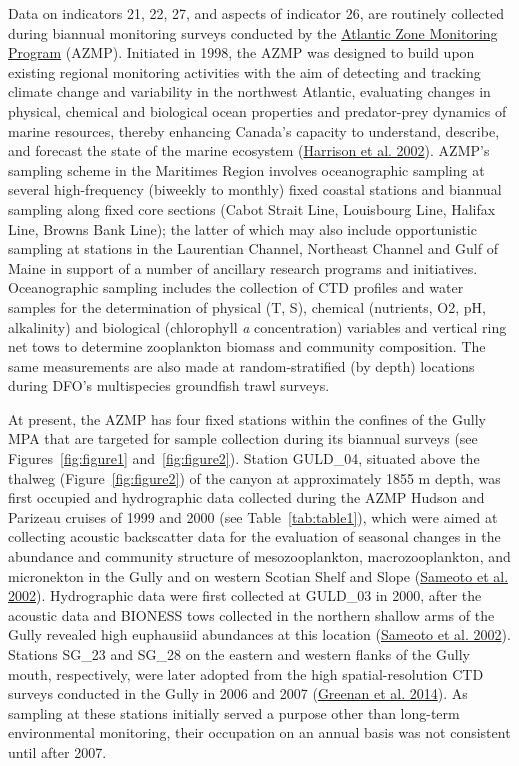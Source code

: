 \documentclass[12pt]{article}\usepackage[]{graphicx}\usepackage[]{color}
\begin{document}
Data on indicators 21, 22, 27, and aspects of indicator 26, are routinely collected during biannual monitoring surveys conducted by the \href{https://www.dfo-mpo.gc.ca/science/data-donnees/azmp-pmza/index-eng.html}{Atlantic Zone Monitoring Program} (AZMP). Initiated in 1998, the AZMP was designed to build upon existing regional monitoring activities with the aim of detecting and tracking climate change and variability in the northwest Atlantic, evaluating changes in physical, chemical and biological ocean properties and predator-prey dynamics of marine resources, thereby enhancing Canada's capacity to understand, describe, and forecast the state of the marine ecosystem (\protect\hyperlink{ref-harrison_2002}{Harrison et al. 2002}). AZMP's sampling scheme in the Maritimes Region involves oceanographic sampling at several high-frequency (biweekly to monthly) fixed coastal stations and biannual sampling along fixed core sections (Cabot Strait Line, Louisbourg Line, Halifax Line, Browns Bank Line); the latter of which may also include opportunistic sampling at stations in the Laurentian Channel, Northeast Channel and Gulf of Maine in support of a number of ancillary research programs and initiatives. Oceanographic sampling includes the collection of CTD profiles and water samples for the determination of physical (T, S), chemical (nutrients, O2, pH, alkalinity) and biological (chlorophyll \emph{a} concentration) variables and vertical ring net tows to determine zooplankton biomass and community composition. The same measurements are also made at random-stratified (by depth) locations during DFO's multispecies groundfish trawl surveys.

At present, the AZMP has four fixed stations within the confines of the Gully MPA that are targeted for sample collection during its biannual surveys (see Figures~\ref{fig:figure1} and~\ref{fig:figure2}). Station GULD\_04, situated above the thalweg (Figure~\ref{fig:figure2}) of the canyon at approximately 1855 m depth, was first occupied and hydrographic data collected during the AZMP Hudson and Parizeau cruises of 1999 and 2000 (see Table~\ref{tab:table1}), which were aimed at collecting acoustic backscatter data for the evaluation of seasonal changes in the abundance and community structure of mesozooplankton, macrozooplankton, and micronekton in the Gully and on western Scotian Shelf and Slope (\protect\hyperlink{ref-sameoto_2002}{Sameoto et al. 2002}). Hydrographic data were first collected at GULD\_03 in 2000, after the acoustic data and BIONESS tows collected in the northern shallow arms of the Gully revealed high euphausiid abundances at this location (\protect\hyperlink{ref-sameoto_2002}{Sameoto et al. 2002}). Stations SG\_23 and SG\_28 on the eastern and western flanks of the Gully mouth, respectively, were later adopted from the high spatial-resolution CTD surveys conducted in the Gully in 2006 and 2007 (\protect\hyperlink{ref-greenan_2014}{Greenan et al. 2014}). As sampling at these stations initially served a purpose other than long-term environmental monitoring, their occupation on an annual basis was not consistent until after 2007.
\end{document}
